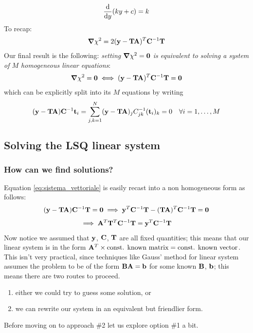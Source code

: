 \documentclass[a4paper]{article}
\newcommand{\mat}[1]{\vb{#1}}
\begin{document}
\begin{equation*}
    \dv{y}(ky+c) = k
\end{equation*}
To recap:
\begin{equation}
\label{eq:gradiente_finale}
    \grad \chi^2 = 2(\vb{y}-\mat{T}\vb{A})^T\mat{C}^{-1}\mat{T}
\end{equation}
Our final result is the following: \emph{setting $\grad\chi^2 = \vb{0}$ is equivalent to solving a system of $M$ homogeneous linear equations}:
\begin{equation}
\label{eq:sistema_vettoriale}
    \grad\chi^2 = \vb{0} \iff (\vb{y}-\mat{T}\vb{A})^T \mat{C}^{-1}\mat{T} = \vb{0}
\end{equation}
which can be explicitly split into its $M$ equations by writing
\begin{equation*}
    (\vb{y}-\mat{T}\vb{A}) \mat{C}^{-1} \vb{t}_i = \sum_{j,k=1}^N (\vb{y}-\mat{T}\vb{A})_j C_{jk}^{-1} (\vb{t}_i)_k = 0 \quad \forall i = 1, \dots, M
\end{equation*}
\subsection{Solving the LSQ linear system}
\subsubsection{How can we find solutions?}
Equation \eqref{eq:sistema_vettoriale} is easily recast into a non homogeneous form as follows:
\begin{equation*}
    (\vb{y}-\mat{T}\vb{A})\mat{C}^{-1}\mat{T} = \vb{0} \implies \vb{y}^T\mat{C}^{-1}\mat{T} - (\mat{T}\vb{A})^T\mat{C}^{-1} \mat{T} = \vb{0}
\end{equation*}
\begin{equation}
\label{eq:sistema_brutto}
    \implies \vb{A}^T \mat{T}^T \mat{C}^{-1}\mat{T} = \vb{y}^T \mat{C}^{-1}\mat{T}
\end{equation}
Now notice we assumed that $\vb{y}$, $\mat{C}$, $\mat{T}$ are all fixed quantities; this means that our linear system is in the form $\vb{A}^T \times \text{const. known matrix} = \text{const. known vector}$. This isn't very practical, since techniques like Gauss' method for linear system assumes the problem to be of the form $\mat{B}\vb{A} = \vb{b}$ for some known $\mat{B}$, $\vb{b}$; this means there are two routes to proceed.
\begin{enumerate}
    \item either we could try to guess some solution, or
    \item we can rewrite our system in an equivalent but friendlier form.
\end{enumerate}
Before moving on to approach \#2 let us explore option \#1 a bit.
\end{document}
